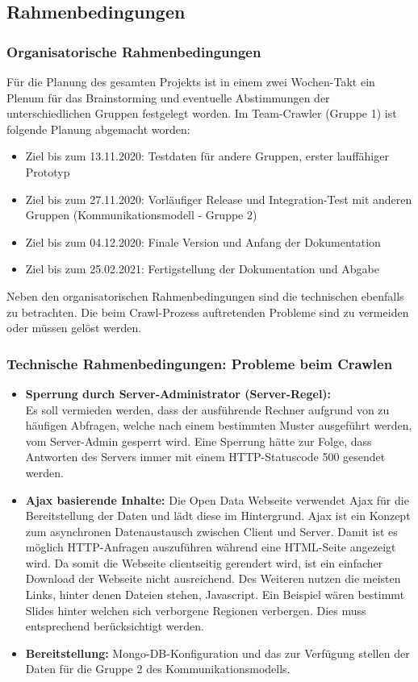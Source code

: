 \subsection{Rahmenbedingungen}\label{subsec:02_02_rahmenbedingungen}
\subsubsection{Organisatorische Rahmenbedingungen}
Für die Planung des gesamten Projekts ist in einem zwei Wochen-Takt ein Plenum für das Brainstorming und eventuelle Abstimmungen der unterschiedlichen Gruppen festgelegt worden. Im Team-Crawler (Gruppe 1) ist folgende Planung abgemacht worden:
\begin{itemize}
    \item Ziel bis zum 13.11.2020: Testdaten für andere Gruppen, erster lauffähiger Prototyp
    \item Ziel bis zum 27.11.2020: Vorläufiger Release und Integration-Test mit anderen Gruppen (Kommunikationsmodell - Gruppe 2)
    \item Ziel bis zum 04.12.2020: Finale Version und Anfang der Dokumentation
    \item Ziel bis zum 25.02.2021: Fertigstellung der Dokumentation und Abgabe
\end{itemize}
Neben den organisatorischen Rahmenbedingungen sind die technischen ebenfalls zu betrachten. Die beim Crawl-Prozess auftretenden Probleme sind zu vermeiden oder müssen gelöst werden.
\subsubsection{Technische Rahmenbedingungen: Probleme beim Crawlen}\label{subsubsec:techAnforderungen}
\begin{itemize}
    \item \textbf {Sperrung durch Server-Administrator (Server-Regel):} 
    \\Es soll vermieden werden, dass der ausführende Rechner aufgrund von zu häufigen Abfragen, welche nach einem bestimmten Muster ausgeführt werden, vom Server-Admin gesperrt wird. Eine Sperrung hätte zur Folge, dass Antworten des Servers immer mit einem HTTP-Statuscode 500 gesendet werden.
    \item \textbf{Ajax basierende Inhalte:} Die Open Data Webseite verwendet Ajax für die Bereitstellung der Daten und lädt diese im Hintergrund. Ajax ist ein Konzept zum asynchronen Datenaustausch zwischen Client und Server. Damit ist es möglich HTTP-Anfragen auszuführen während eine HTML-Seite angezeigt wird. Da somit die Webseite clientseitig gerendert wird, ist ein einfacher Download der Webseite nicht ausreichend. Des Weiteren nutzen die meisten Links, hinter denen Dateien stehen, Javascript. Ein Beispiel wären bestimmt Slides hinter welchen sich verborgene Regionen verbergen. Dies muss entsprechend berücksichtigt werden.
    \item  \textbf{Bereitstellung:} Mongo-DB-Konfiguration und das zur Verfügung stellen der Daten für die Gruppe 2 des Kommunikationsmodells.
\end{itemize}